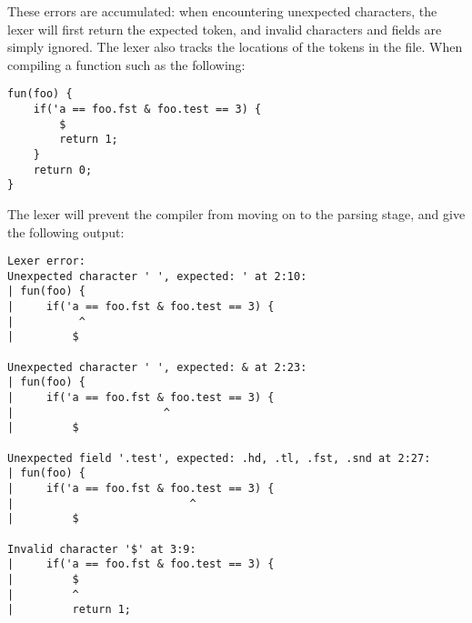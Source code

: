 
These errors are accumulated: when encountering unexpected characters, the lexer will first return the expected token, and invalid characters and fields are simply ignored.
The lexer also tracks the locations of the tokens in the file.
When compiling a function such as the following:

\begin{lstlisting}
fun(foo) {
    if('a == foo.fst & foo.test == 3) {
        $
        return 1;
    }
    return 0;
}
\end{lstlisting}

The lexer will prevent the compiler from moving on to the parsing stage, and give the following output:

\begin{lstlisting}[language={}]
Lexer error:
Unexpected character ' ', expected: ' at 2:10:
| fun(foo) {
|     if('a == foo.fst & foo.test == 3) {
|          ^
|         $

Unexpected character ' ', expected: & at 2:23:
| fun(foo) {
|     if('a == foo.fst & foo.test == 3) {
|                       ^
|         $

Unexpected field '.test', expected: .hd, .tl, .fst, .snd at 2:27:
| fun(foo) {
|     if('a == foo.fst & foo.test == 3) {
|                           ^
|         $

Invalid character '$' at 3:9:
|     if('a == foo.fst & foo.test == 3) {
|         $
|         ^
|         return 1;
\end{lstlisting}

